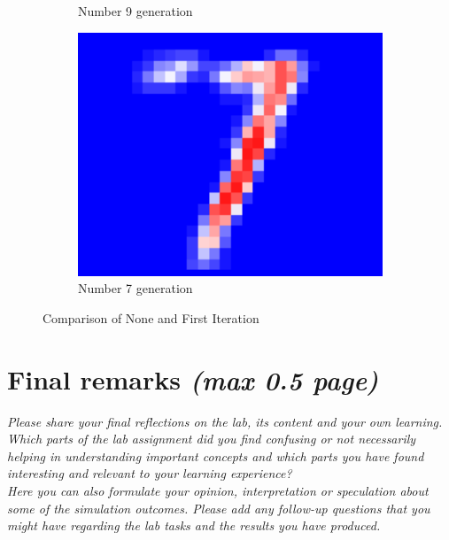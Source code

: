 \documentclass[a4paper]{article}
\begin{document}
\begin{figure}[htb]
\begin{subfigure}[b]{0.32\textwidth}
        \caption{Number 9 generation}
        \label{fig:number9gen}
    \end{subfigure}
    \begin{subfigure}[b]{0.32\textwidth}
        \centering
        \includegraphics[width=\textwidth]{Labs/Lab 4/Rakin/7_gif_img.png}
        \caption{Number 7 generation}
        \label{fig:number7gen}
    \end{subfigure}
    \caption{Comparison of None and First Iteration}
    \label{fig:Lab4Generation}
\end{figure}



\section{Final remarks \normalsize{\textit{(max 0.5 page)}}}
\textit{Please share your final reflections on the lab, its content and your own learning. Which parts of the lab assignment did you find confusing or not necessarily helping in understanding important concepts and which parts you have found interesting and relevant to your learning experience? \\
Here you can also formulate your opinion, interpretation or speculation about some of the simulation outcomes. Please add any follow-up questions that you might have regarding the lab tasks and the results you have produced.}

\printbibliography
\end{document}
